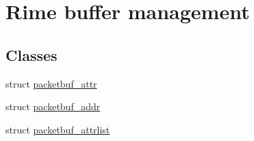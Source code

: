 \hypertarget{group__packetbuf}{}\section{Rime buffer management}
\label{group__packetbuf}
\subsection*{Classes}
\begin{DoxyCompactItemize}
\item 
struct \hyperlink{structpacketbuf__attr}{packetbuf\+\_\+attr}
\item 
struct \hyperlink{structpacketbuf__addr}{packetbuf\+\_\+addr}
\item 
struct \hyperlink{structpacketbuf__attrlist}{packetbuf\+\_\+attrlist}
\end{DoxyCompactItemize}
